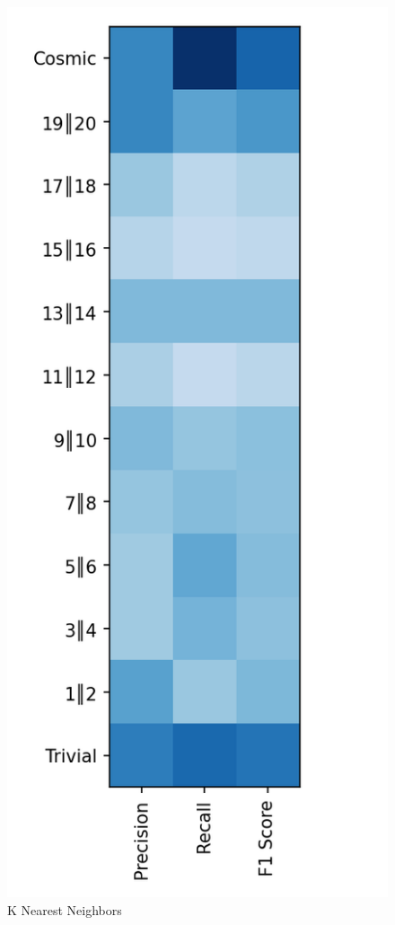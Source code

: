 \documentclass{article}
\begin{document}
\begin{figure}[ht]
\begin{minipage}[b]{0.32\linewidth}
			\caption*{K Nearest Neighbors} 
			\vspace{10ex}
		\end{minipage} \hfill
		\begin{minipage}[b]{0.32\linewidth}
			\centering
			\includegraphics[width=\linewidth]{12 - Logistic Regression.png} 

\end{minipage}
\end{figure}
\end{document}
